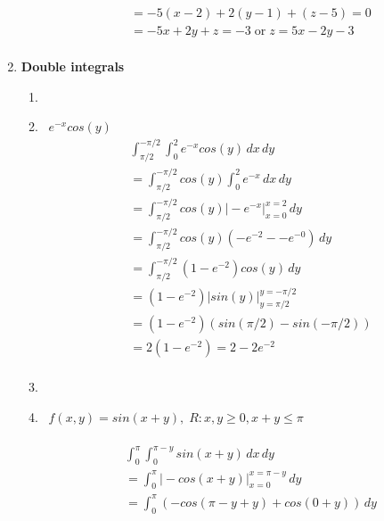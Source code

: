 \documentclass[11pt]{article}
\newcommand\Item[1][]{%
  \ifx\relax#1\relax  \item \else \item[#1] \fi
  \abovedisplayskip=0pt\abovedisplayshortskip=0pt~\vspace*{-\baselineskip}}
\begin{document}
\begin{preview}
\begin{enumerate}
\begin{enumerate}
\begin{align*}
                                                         & = -5(x-2) + 2(y-1) + (z-5) = 0                                                        \\
                                                         & = -5x + 2y + z= -3 \; \mathrm{or} \; z = 5x -2y -3                                    \\
                  \end{align*}
              \end{enumerate}
        \item \textbf{Double integrals}
              \begin{enumerate}
                  \Item $e^{-x}cos(y)$ \\
                  \begin{align*}
                       & \int_{\pi/2}^{-\pi/2} \int_{0}^{2} e^{-x}cos(y) \,dx  \,dy           \\
                       & =  \int_{\pi/2}^{-\pi/2} cos(y) \int_{0}^{2} e^{-x} \,dx  \,dy       \\
                       & =  \int_{\pi/2}^{-\pi/2} cos(y) \Big| -e^{-x} \Big|_{x=0}^{x=2} \,dy \\
                       & =  \int_{\pi/2}^{-\pi/2} cos(y) \left(-e^{-2} - -e^{-0}\right) \,dy  \\
                       & =  \int_{\pi/2}^{-\pi/2} (1-e^{-2})cos(y) \,dy                       \\
                       & =  (1-e^{-2}) \Big| sin(y) \Big|_{y=\pi/2}^{y=-\pi/2}                \\
                       & =  (1-e^{-2}) (sin(\pi/2) - sin(-\pi/2))                             \\
                       & =  2(1-e^{-2}) = 2-2e^{-2}                                           \\
                  \end{align*}
                  \Item $f(x, y) = sin(x+y), \; R : x,y \ge 0, x+y \le \pi$\\\\
                  \begin{align*}
                       & \int_{0}^{\pi} \int_{0}^{\pi-y} sin(x+y) \,dx  \,dy                                                  \\
                       & = \int_{0}^{\pi} \Big| -cos(x+y) \Big|_{x=0}^{x=\pi-y}  \,dy                                         \\
                       & = \int_{0}^{\pi} (-cos(\pi-y+y) + cos(0+y))  \,dy                                                    \\

\end{align*}
\end{enumerate}
\end{enumerate}
\end{preview}
\end{document}
